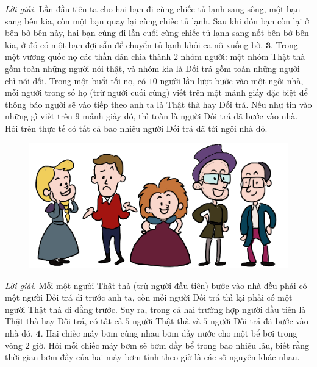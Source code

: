 \begin{multicols}{2}
\begin{figure}[H]
		\vspace*{-15pt}
	\end{figure}
	\textit{Lời giải.} Lần đầu tiên ta cho hai bạn đi cùng chiếc tủ lạnh sang sông, một bạn sang bên kia, còn một bạn quay lại cùng chiếc tủ lạnh. Sau khi đón bạn còn lại ở bên bờ bên này, hai bạn cùng đi lần cuối cùng chiếc tủ lạnh sang nốt bên bờ bên kia, ở đó có một bạn đợi sẵn để chuyển tủ lạnh khỏi ca nô xuống bờ.
	\vskip 0.1cm
	$\pmb{3.}$ Trong một vương quốc nọ các thần dân chia thành $2$ nhóm người: một nhóm Thật thà gồm toàn những người nói thật, và nhóm kia là Dối trá gồm toàn những người chỉ nói dối. Trong một buổi tối nọ, có $10$ người lần lượt bước vào một ngôi nhà, mỗi người trong số họ (trừ người cuối cùng) viết trên một mảnh giấy đặc biệt để thông báo người sẽ vào tiếp theo anh ta là Thật thà hay Dối trá. Nếu như tin vào những gì viết trên $9$ mảnh giấy đó, thì toàn là người Dối trá đã bước vào nhà. Hỏi trên thực tế có tất cả bao nhiêu người Dối trá đã tới ngôi nhà đó.	
	\begin{figure}[H]
		\vspace*{-5pt}
		\centering
		\captionsetup{labelformat= empty, justification=centering}
		\includegraphics[width= 1\linewidth]{b3}
		\vspace*{-15pt}
	\end{figure}
	\textit{Lời giải.} Mỗi một người Thật thà (trừ người đầu tiên) bước vào nhà đều phải có một người Dối trá đi trước anh ta, còn mỗi người Dối trá thì lại phải có một người Thật thà đi đằng trước. Suy ra, trong cả hai trường hợp người đầu tiên là Thật thà hay Dối trá, có tất cả $5$ người Thật thà và $5$ người Dối trá đã bước vào nhà đó.
	\vskip 0.1cm
	$\pmb{4.}$ Hai chiếc máy bơm cùng nhau bơm đầy nước cho một bể bơi trong vòng $2$ giờ. Hỏi mỗi chiếc máy bơm sẽ bơm đầy bể trong bao nhiêu lâu, biết rằng thời gian bơm đầy của hai máy bơm tính theo giờ là các số nguyên khác nhau.
	\begin{figure}[H]

\end{figure}
\end{multicols}
